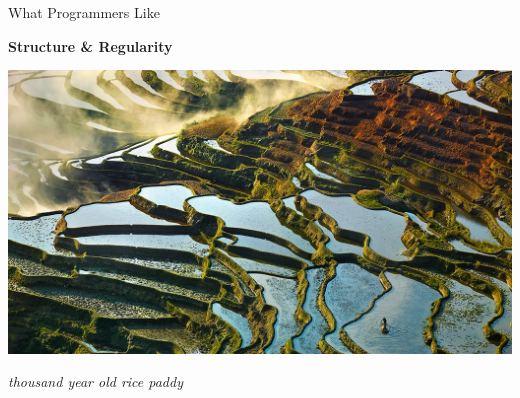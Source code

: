 \documentclass{beamer}
\begin{document}
\begin{frame}{What Programmers Like}

	\textbf{Structure \& Regularity}

	\includegraphics[width=\textwidth]{rice_paddy}

	\textit{thousand year old rice paddy}

\end{frame}
\end{document}
